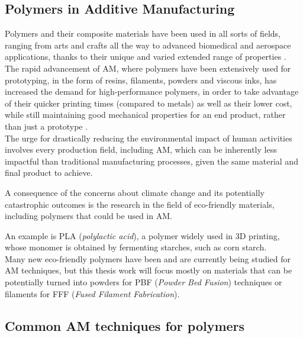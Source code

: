\documentclass{article}
\begin{document}
    \subsection{Polymers in Additive Manufacturing\label{Polymers_in_AM}}

    Polymers and their composite materials have been used in all sorts of fields, ranging from arts and crafts all the way to advanced biomedical and aerospace applications, thanks 
    to their unique and varied extended range of properties \autocites{Latvian_additive,Materials_add_man_718,Messori_Bondioli_PHAs,doi:10.1063/1.4918516,SLS_3dprinting_biomedical_polymers,Kovalcik_PHA_Review,Recent_progress_polymers_AM}. \\  
    
    The rapid advancement of AM, where polymers have been extensively used for prototyping, in the form of resins, filaments, powders and viscous inks, 
    has increased the demand for high-performance polymers, in order to take advantage of their quicker printing times (compared to metals) as well as their lower cost, while still
    maintaining good mechanical properties for an end product, rather than just a prototype \autocite*{Recent_progress_polymers_AM}. \\ 

    The urge for drastically reducing the environmental impact of human activities involves every production field, including AM, which can be inherently less impactful
    than traditional manufacturing processes, given the same material and final product to achieve. 

    A consequence of the concerns about climate change and its potentially catastrophic outcomes is the research in the field of eco-friendly materials, including polymers 
    that could be used in AM. 
    
    An example is PLA (\textit{polylactic acid}), a polymer widely used in 3D printing, whose monomer is obtained by fermenting starches, such as corn starch. \\ 

    Many new eco-friendly polymers have been and are currently being studied for AM techniques, but this thesis work will focus mostly on materials that can be potentially turned 
    into powders for PBF (\textit{Powder Bed Fusion}) techniques or filaments for FFF (\textit{Fused Filament Fabrication}). 
    
    \subsection{Common AM techniques for polymers\label{AM_techniques_summary}}
    
\end{document}
